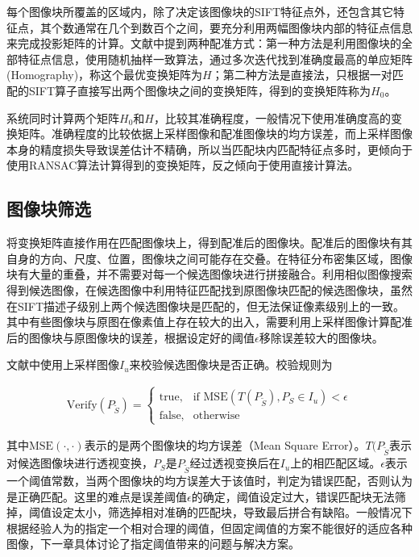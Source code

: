 \documentclass[UTF8]{csoarticle}
\begin{document}
每个图像块所覆盖的区域内，除了决定该图像块的SIFT特征点外，还包含其它特征点，其个数通常在几个到数百个之间，要充分利用两幅图像块内部的特征点信息来完成投影矩阵的计算。文献\cite{Dai:2012vn}中提到两种配准方式：第一种方法是利用图像块的全部特征点信息，使用随机抽样一致算法，通过多次迭代找到准确度最高的单应矩阵(Homography)，称这个最优变换矩阵为\(H\)；第二种方法是直接法，只根据一对匹配的SIFT算子直接写出两个图像块之间的变换矩阵，得到的变换矩阵称为\(H_0\)。

系统同时计算两个矩阵\(H_0\)和\(H\)，比较其准确程度，一般情况下使用准确度高的变换矩阵。准确程度的比较依据上采样图像和配准图像块的均方误差，而上采样图像本身的精度损失导致误差估计不精确，所以当匹配块内匹配特征点多时，更倾向于使用RANSAC算法计算得到的变换矩阵，反之倾向于使用直接计算法。

\subsection{图像块筛选}
将变换矩阵直接作用在匹配图像块上，得到配准后的图像块。配准后的图像块有其自身的方向、尺度、位置，图像块之间可能存在交叠。在特征分布密集区域，图像块有大量的重叠，并不需要对每一个候选图像块进行拼接融合。利用相似图像搜索得到候选图像，在候选图像中利用特征匹配找到原图像块匹配的候选图像块，虽然在SIFT描述子级别上两个候选图像块是匹配的，但无法保证像素级别上的一致。其中有些图像块与原图在像素值上存在较大的出入，需要利用上采样图像计算配准后的图像块与原图像块的误差，根据设定好的阈值\(\epsilon\)移除误差较大的图像块。

文献\cite{Dai:2012vn}中使用上采样图像\(I_u\)来校验候选图像块是否正确。校验规则为

\begin{align}
\label{eq:errorControl}
  \text{Verify}(P_{\tilde{S}}) = 
\begin{cases} 
\text{true}, & \mbox{if MSE} (T(P_{\tilde{S}}),P_S \in I_u) < \epsilon \\
\text{false}, & \mbox{otherwise}
\end{cases}
\end{align}

其中\(\text{MSE}(\cdot,\cdot)\)表示的是两个图像块的均方误差（Mean Square Error）。\(T(P_{\tilde{S}}\)表示对候选图像块进行透视变换，\(P_{S}\)是\(P_{\tilde{S}}\)经过透视变换后在\(I_u\)上的相匹配区域。\(\epsilon\)表示一个阈值常数，当两个图像块的均方误差大于该值时，判定为错误匹配，否则认为是正确匹配。这里的难点是误差阈值\(\epsilon\)的确定，阈值设定过大，错误匹配块无法筛掉，阈值设定太小，筛选掉相对准确的匹配块，导致最后拼合有缺陷。一般情况下根据经验人为的指定一个相对合理的阈值，但固定阈值的方案不能很好的适应各种图像，下一章具体讨论了指定阈值带来的问题与解决方案。
\end{document}

